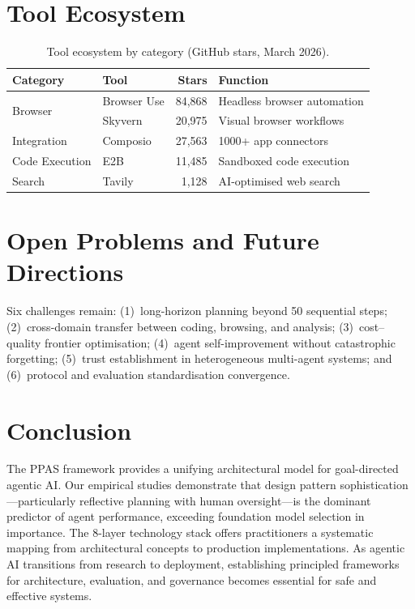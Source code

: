 \documentclass[sn-basic]{sn-jnl}
\theoremstyle{definition}
\begin{document}
\section{Tool Ecosystem}\label{sec:tools}

\begin{table}[ht]
\centering
\caption{Tool ecosystem by category (GitHub stars, March 2026).}
\label{tab:tools}
\begin{tabular}{llrl}
\toprule
\textbf{Category} & \textbf{Tool} & \textbf{Stars} & \textbf{Function} \\
\midrule
\multirow{2}{*}{Browser}     & Browser Use & 84,868 & Headless browser automation \\
                              & Skyvern     & 20,975 & Visual browser workflows \\
Integration                   & Composio    & 27,563 & 1000+ app connectors \\
Code Execution                & E2B         & 11,485 & Sandboxed code execution \\
Search                        & Tavily      & 1,128  & AI-optimised web search \\
\bottomrule
\end{tabular}
\end{table}

\section{Open Problems and Future Directions}\label{sec:future}

Six challenges remain: (1)~long-horizon planning beyond 50 sequential steps; (2)~cross-domain transfer between coding, browsing, and analysis; (3)~cost--quality frontier optimisation; (4)~agent self-improvement without catastrophic forgetting; (5)~trust establishment in heterogeneous multi-agent systems; and (6)~protocol and evaluation standardisation convergence.

\section{Conclusion}\label{sec:conclusion}

The PPAS framework provides a unifying architectural model for goal-directed agentic AI. Our empirical studies demonstrate that design pattern sophistication---particularly reflective planning with human oversight---is the dominant predictor of agent performance, exceeding foundation model selection in importance. The 8-layer technology stack offers practitioners a systematic mapping from architectural concepts to production implementations. As agentic AI transitions from research to deployment, establishing principled frameworks for architecture, evaluation, and governance becomes essential for safe and effective systems.
\end{document}
